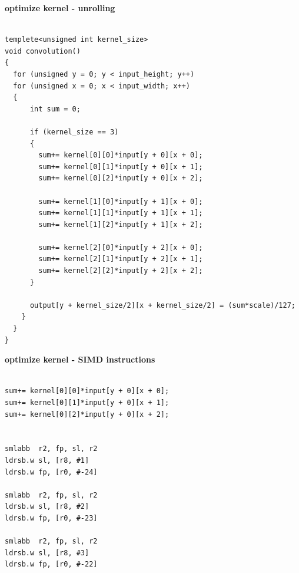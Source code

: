 \documentclass[xcolor=dvipsnames]{beamer}
\begin{document}
\begin{frame}[fragile]
{\bf optimize kernel - unrolling}


\begin{lstlisting}

templete<unsigned int kernel_size>
void convolution()
{
  for (unsigned y = 0; y < input_height; y++)
  for (unsigned x = 0; x < input_width; x++)
  {
      int sum = 0;

      if (kernel_size == 3)
      {
        sum+= kernel[0][0]*input[y + 0][x + 0];
        sum+= kernel[0][1]*input[y + 0][x + 1];
        sum+= kernel[0][2]*input[y + 0][x + 2];

        sum+= kernel[1][0]*input[y + 1][x + 0];
        sum+= kernel[1][1]*input[y + 1][x + 1];
        sum+= kernel[1][2]*input[y + 1][x + 2];

        sum+= kernel[2][0]*input[y + 2][x + 0];
        sum+= kernel[2][1]*input[y + 2][x + 1];
        sum+= kernel[2][2]*input[y + 2][x + 2];
      }

      output[y + kernel_size/2][x + kernel_size/2] = (sum*scale)/127;
    }
  }
}
\end{lstlisting}

\end{frame}


\begin{frame}[fragile]
{\bf optimize kernel - SIMD instructions}



\begin{lstlisting}

sum+= kernel[0][0]*input[y + 0][x + 0];
sum+= kernel[0][1]*input[y + 0][x + 1];
sum+= kernel[0][2]*input[y + 0][x + 2];


smlabb	r2, fp, sl, r2
ldrsb.w	sl, [r8, #1]
ldrsb.w	fp, [r0, #-24]

smlabb	r2, fp, sl, r2
ldrsb.w	sl, [r8, #2]
ldrsb.w	fp, [r0, #-23]

smlabb	r2, fp, sl, r2
ldrsb.w	sl, [r8, #3]
ldrsb.w	fp, [r0, #-22]

\end{lstlisting}


\end{frame}
\end{document}
